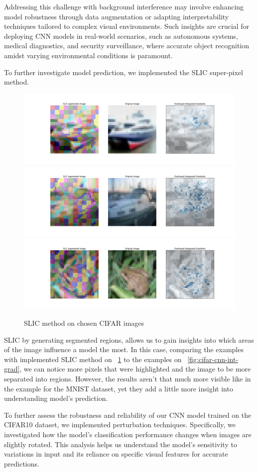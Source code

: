 \documentclass[journal, a4paper]{IEEEtran}
\begin{document}
Addressing this challenge with background interference may involve enhancing model robustness through data augmentation or adapting interpretability techniques tailored to complex visual environments.
Such insights are crucial for deploying CNN models in real-world scenarios, such as autonomous systems, medical diagnostics, and security surveillance, where accurate object recognition amidst varying environmental conditions is paramount.

To further investigate model prediction, we implemented the SLIC super-pixel method.

\begin{figure}[ht]\centering
    \includegraphics[width=.6\linewidth]{img/SLIC/cifar/img_2}
    \includegraphics[width=.6\linewidth]{img/SLIC/cifar/img_3}
    \includegraphics[width=.6\linewidth]{img/SLIC/cifar/img_5}
    \caption{SLIC method on chosen CIFAR images}\label{fig:cifar-cnn-slic}
\end{figure}

SLIC by generating segmented regions, allows us to gain insights into which areas of the image influence a model the most.
In this case, comparing the examples with implemented SLIC method on ~\ref{fig:cifar-cnn-slic} to the examples on ~\ref{fig:cifar-cnn-int-grad}, we can notice more pixels that were highlighted and the image to be more separated into regions.
However, the results aren't that much more visible like in the example for the MNIST dataset, yet they add a little more insight into understanding model's prediction.

To further assess the robustness and reliability of our CNN model trained on the CIFAR10 dataset, we implemented perturbation techniques.
Specifically, we investigated how the model's classification performance changes when images are slightly rotated.
This analysis helps us understand the model's sensitivity to variations in input and its reliance on specific visual features for accurate predictions.
\end{document}
